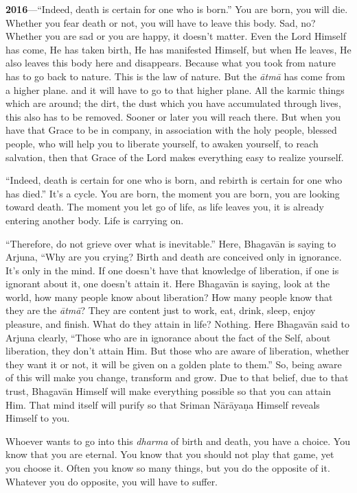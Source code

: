 \textbf{2016}---“Indeed, death is certain for one who is born.” You are born, you will die. Whether you fear death or not, you will have to leave this body. Sad, no? Whether you are sad or you are happy, it doesn’t matter. Even the Lord Himself has come, He has taken birth, He has manifested Himself, but when He leaves, He also leaves this body here and disappears. Because what you took from nature has to go back to nature. This is the law of nature. But the \textit{ātmā} has come from a higher plane. and it will have to go to that higher plane. All the karmic things which are around; the dirt, the dust which you have accumulated through lives, this also has to be removed. Sooner or later you will reach there. But when you have that Grace to be in company, in association with the holy people, blessed people, who will help you to liberate yourself, to awaken yourself, to reach salvation, then that Grace of the Lord makes everything easy to realize yourself.

“Indeed, death is certain for one who is born, and rebirth is certain for one who has died.” It’s a cycle. You are born, the moment you are born, you are looking toward death. The moment you let go of life, as life leaves you, it is already entering another body. Life is carrying on.

“Therefore, do not grieve over what is inevitable.” Here, Bhagavān is saying to Arjuna, “Why are you crying? Birth and death are conceived only in ignorance. It’s only in the mind. If one doesn’t have that knowledge of liberation, if one is ignorant about it, one doesn’t attain it. Here Bhagavān is saying, look at the world, how many people know about liberation? How many people know that they are the \textit{ātmā}? They are content just to work, eat, drink, sleep, enjoy pleasure, and finish. What do they attain in life? Nothing. Here Bhagavān said to Arjuna clearly, “Those who are in ignorance about the fact of the Self, about liberation, they don’t attain Him. But those who are aware of liberation, whether they want it or not, it will be given on a golden plate to them.” So, being aware of this will make you change, transform and grow. Due to that belief, due to that trust, Bhagavān Himself will make everything possible so that you can attain Him. That mind itself will purify so that Sriman Nārāyaṇa Himself reveals Himself to you.

Whoever wants to go into this \textit{dharma} of birth and death, you have a choice. You know that you are eternal. You know that you should not play that game, yet you choose it. Often you know so many things, but you do the opposite of it. Whatever you do opposite, you will have to suffer.

